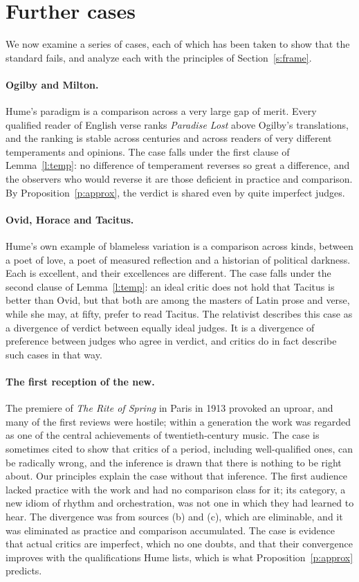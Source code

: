\documentclass{situationist-preprint}
\begin{document}
\section{Further cases}\label{s:cases}

We now examine a series of cases, each of which has been taken to show that the standard fails, and analyze each with the principles of Section~\ref{s:frame}.

\paragraph{Ogilby and Milton.} Hume's paradigm is a comparison across a very large gap of merit. Every qualified reader of English verse ranks \emph{Paradise Lost} above Ogilby's translations, and the ranking is stable across centuries and across readers of very different temperaments and opinions. The case falls under the first clause of Lemma~\ref{l:temp}: no difference of temperament reverses so great a difference, and the observers who would reverse it are those deficient in practice and comparison. By Proposition~\ref{p:approx}, the verdict is shared even by quite imperfect judges.

\paragraph{Ovid, Horace and Tacitus.} Hume's own example of blameless variation is a comparison across kinds, between a poet of love, a poet of measured reflection and a historian of political darkness. Each is excellent, and their excellences are different. The case falls under the second clause of Lemma~\ref{l:temp}: an ideal critic does not hold that Tacitus is better than Ovid, but that both are among the masters of Latin prose and verse, while she may, at fifty, prefer to read Tacitus. The relativist describes this case as a divergence of verdict between equally ideal judges. It is a divergence of preference between judges who agree in verdict, and critics do in fact describe such cases in that way.

\paragraph{The first reception of the new.} The premiere of \emph{The Rite of Spring} in Paris in 1913 provoked an uproar, and many of the first reviews were hostile; within a generation the work was regarded as one of the central achievements of twentieth-century music. The case is sometimes cited to show that critics of a period, including well-qualified ones, can be radically wrong, and the inference is drawn that there is nothing to be right about. Our principles explain the case without that inference. The first audience lacked practice with the work and had no comparison class for it; its category, a new idiom of rhythm and orchestration, was not one in which they had learned to hear. The divergence was from sources (b) and (c), which are eliminable, and it was eliminated as practice and comparison accumulated. The case is evidence that actual critics are imperfect, which no one doubts, and that their convergence improves with the qualifications Hume lists, which is what Proposition~\ref{p:approx} predicts.
\end{document}
